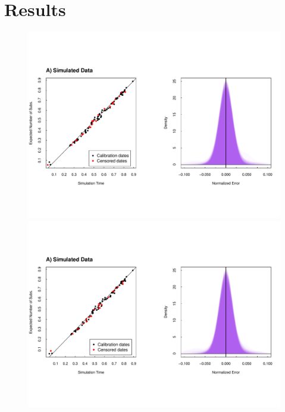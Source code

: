 \section{Results} \label{sec:results}

\begin{figure} \label{fig:results1}
	\centering
	\includegraphics[trim=0cm 0cm 0cm 6cm, clip=true, scale=0.425]{figures/simulated.pdf} \\
	\includegraphics[trim=0cm 0cm 0cm 7cm, clip=true,scale=0.425]{figures/simulated_latent.pdf}\\
	\caption[Examples]{}
\end{figure}

